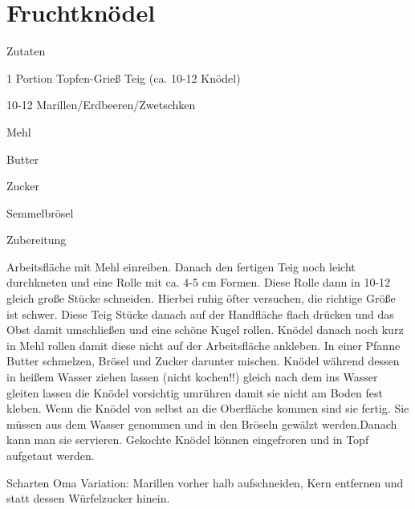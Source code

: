 \chapter*{Fruchtknödel}
\begin{multicols}{2}
 {\Large Zutaten}
 \begin{Zutaten}
		\item 1 Portion Topfen-Grieß Teig (ca. 10-12
		Knödel)
		\item 10-12 Marillen/Erdbeeren/Zwetschken
		\item Mehl
		\item Butter
		\item Zucker
		\item Semmelbrösel
		
		
\end{Zutaten}
	
\columnbreak
{}
\end{multicols}

{\Large Zubereitung} \newline
\begin{addmargin}[1cm]{0cm}
	Arbeitsfläche mit Mehl einreiben. Danach den fertigen Teig noch leicht durchkneten und eine Rolle
	mit ca. 4-5 cm Formen.\newline
	Diese Rolle dann in 10-12 gleich große Stücke schneiden. Hierbei ruhig öfter versuchen, die richtige
	Größe ist schwer.\newline
	Diese Teig Stücke danach auf der Handfläche flach drücken und das Obst damit umschließen und eine
	schöne Kugel rollen. Knödel danach noch kurz in Mehl rollen damit diese nicht auf der Arbeitsfläche
	ankleben.\newline
	In einer Pfanne Butter schmelzen, Brösel und Zucker darunter mischen.\newline
	Knödel während dessen in heißem Wasser ziehen lassen (nicht kochen!!) gleich nach dem ins Wasser
	gleiten lassen die Knödel vorsichtig umrühren damit sie nicht am Boden fest kleben.\newline
	Wenn die Knödel von selbst an die Oberfläche kommen sind sie fertig. Sie müssen aus dem Wasser
	genommen und in den Bröseln gewälzt werden.\newline Danach kann man sie servieren.\newline
	Gekochte Knödel können eingefroren und in Topf aufgetaut werden.\newline\newline
	
	Scharten Oma Variation: Marillen vorher halb aufschneiden, Kern entfernen und statt dessen
	Würfelzucker hinein.
	
	
\end{addmargin}
